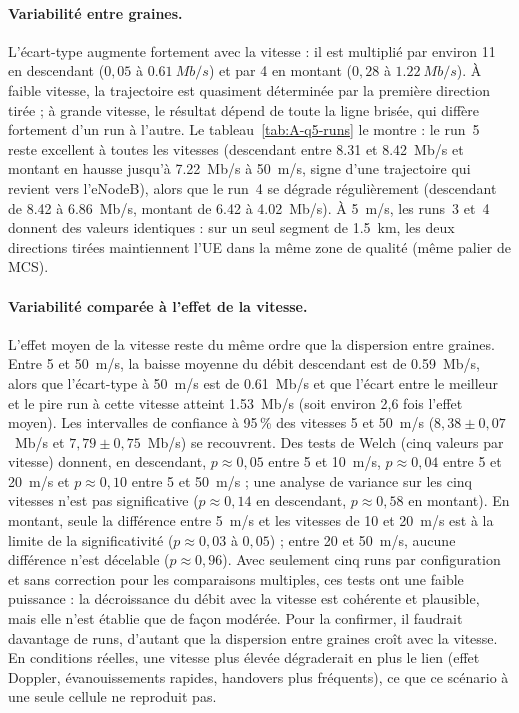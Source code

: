 \paragraph{Variabilité entre graines.} L'écart-type augmente fortement avec
la vitesse : il est multiplié par environ 11 en descendant ($0{,}05$ à
$\SI{0.61}{Mb/s}$) et par 4 en montant ($0{,}28$ à $\SI{1.22}{Mb/s}$). À faible
vitesse, la trajectoire est quasiment déterminée par la première direction
tirée ; à grande vitesse, le résultat dépend de toute la ligne brisée, qui
diffère fortement d'un run à l'autre. Le tableau~\ref{tab:A-q5-runs} le
montre : le run~5 reste excellent à toutes les vitesses (descendant entre
\num{8.31} et \SI{8.42}{Mb/s} et montant en hausse jusqu'à \SI{7.22}{Mb/s} à
\SI{50}{m/s}, signe d'une trajectoire qui revient vers l'eNodeB), alors que le
run~4 se dégrade régulièrement (descendant de \num{8.42} à \SI{6.86}{Mb/s}, montant de
\num{6.42} à \SI{4.02}{Mb/s}). À \SI{5}{m/s}, les runs~3 et~4 donnent des
valeurs identiques : sur un seul segment de \SI{1.5}{km}, les deux directions
tirées maintiennent l'UE dans la même zone de qualité (même palier de MCS).

\paragraph{Variabilité comparée à l'effet de la vitesse.} L'effet moyen de la
vitesse reste du même ordre que la dispersion entre graines. Entre 5 et
\SI{50}{m/s}, la baisse moyenne du débit descendant est de \SI{0.59}{Mb/s},
alors que l'écart-type à \SI{50}{m/s} est de \SI{0.61}{Mb/s} et que l'écart
entre le meilleur et le pire run à cette vitesse atteint \SI{1.53}{Mb/s}
(soit environ 2,6 fois l'effet moyen). Les intervalles de confiance à 95\,\%
des vitesses 5 et \SI{50}{m/s} ($8{,}38 \pm 0{,}07$~Mb/s et
$7{,}79 \pm 0{,}75$~Mb/s) se recouvrent. Des tests de Welch (cinq valeurs par
vitesse) donnent, en descendant, $p\approx0{,}05$ entre 5 et \SI{10}{m/s},
$p\approx0{,}04$ entre 5 et \SI{20}{m/s} et $p\approx0{,}10$ entre 5 et
\SI{50}{m/s} ; une analyse de variance sur les cinq vitesses n'est pas
significative ($p\approx0{,}14$ en descendant, $p\approx0{,}58$ en montant).
En montant, seule la différence entre \SI{5}{m/s} et les vitesses de 10 et
\SI{20}{m/s} est à la limite de la significativité ($p\approx0{,}03$ à $0{,}05$) ;
entre 20 et \SI{50}{m/s}, aucune différence n'est décelable ($p\approx0{,}96$).
Avec seulement cinq runs par configuration et sans correction pour les
comparaisons multiples, ces tests ont une faible puissance : la décroissance
du débit avec la vitesse est cohérente et plausible, mais elle n'est
établie que de façon modérée. Pour la confirmer, il faudrait davantage de
runs, d'autant que la dispersion entre graines croît avec la vitesse. En
conditions réelles, une vitesse plus élevée dégraderait en plus le lien (effet
Doppler, évanouissements rapides, handovers plus fréquents), ce que ce scénario
à une seule cellule ne reproduit pas.

